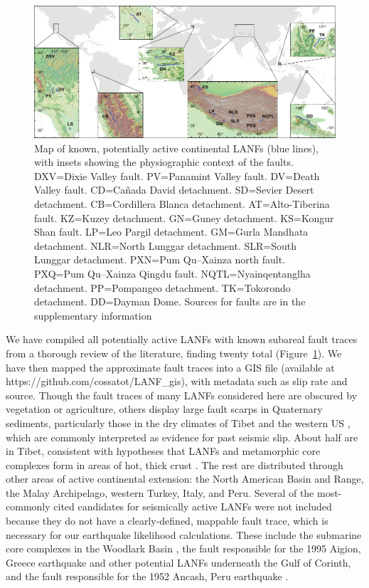 \documentclass[twocolumn,grl]{AGUTeX}
\begin{document}
\begin{article}
\begin{figure}%
\noindent\includegraphics[width=40pc]{./figures/active_lanfs_map_insets.pdf}
\caption{Map of known, potentially active continental LANFs (blue lines), with
insets showing the physiographic context of the faults.  DXV=Dixie Valley
fault.  PV=Panamint Valley fault.  DV=Death Valley fault.  CD=Ca\~nada David
detachment.  SD=Sevier Desert detachment.  CB=Cordillera Blanca detachment.  
AT=Alto-Tiberina fault.  KZ=Kuzey detachment.  GN=Guney detachment.  
KS=Kongur Shan fault.  LP=Leo Pargil detachment.  GM=Gurla Mandhata 
detachment. NLR=North Lunggar detachment.  SLR=South Lunggar detachment.  
PXN=Pum Qu--Xainza north fault.  PXQ=Pum Qu--Xainza Qingdu fault. 
NQTL=Nyainqentanglha detachment.  PP=Pompangeo detachment.  
TK=Tokorondo detachment.  DD=Dayman Dome.  Sources for faults are in the 
supplementary information}
\label{fig:lanf_map}
\end{figure}

We have compiled all potentially active LANFs with known subareal
fault traces from a thorough review of the literature, finding twenty
total (Figure~\ref{fig:lanf_map}).  We have then mapped the approximate fault
traces into a GIS file (available at https://github.com/cossatot/LANF\_gis), 
with metadata such as slip rate and source. Though the fault traces of many
LANFs considered here are obscured by vegetation or agriculture, others
display large fault scarps in Quaternary sediments, particularly those in the
dry climates of Tibet \citep[e.g.,][]{styron2013slr, kapp2005nqtl} and the
western US \citep[e.g.,][]{axen1999baja, hayman2003dv}, which are commonly
interpreted as evidence for past seismic slip.  About half are in Tibet,
consistent with hypotheses that LANFs and metamorphic core complexes
form in areas of hot, thick crust \citep [e.g.,][]{buck1991mcc}.  The
rest are distributed through other areas of active continental
extension: the North American Basin and Range, the Malay Archipelago,
western Turkey, Italy, and Peru. Several of the most-commonly cited
candidates for seismically active LANFs were not included because they
do not have a clearly-defined, mappable fault trace, which is
necessary for our earthquake likelihood calculations.  These include the 
submarine core complexes in the Woodlark Basin \citep{abers2001}, the fault
responsible for the 1995 Aigion, Greece earthquake \citep{bernard1997}
and other potential LANFs underneath the Gulf of Corinth, and the
fault responsible for the 1952 Ancash, Peru earthquake
\citep{doser1987ancash}.



\end{article}
\end{document}
